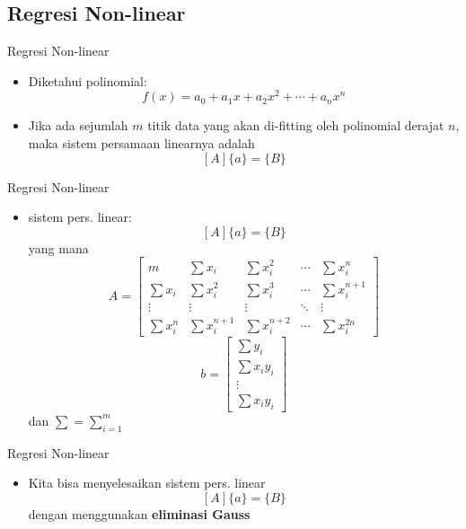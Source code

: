 \documentclass[pdflatex,compress,mathserif]{beamer}
\begin{document}
\subsection{Regresi Non-linear}

\begin{frame}{Regresi Non-linear}
	\begin{itemize}
		\item Diketahui polinomial:
		$$ f(x) = a_0 + a_1 x + a_2 x^2 + \cdots + a_n x^n $$
		\item Jika ada sejumlah $m$ titik data yang akan di-fitting oleh polinomial derajat $n$, maka sistem persamaan linearnya adalah
		$$ [A]\{a\} = \{B\} $$
	\end{itemize}
\end{frame}

\begin{frame}{Regresi Non-linear}
	\begin{itemize}
		\item sistem pers. linear: $$ [A]\{a\} = \{B\} $$
		yang mana
		$$ A = \begin{bmatrix}
			m & \sum x_i & \sum x_i^2 & \cdots & \sum x_i^n \\
			\sum x_i & \sum x_i^2 & \sum x_i^3 & \cdots & \sum x_i^{n+1} \\
			\vdots & \vdots & \vdots & \ddots & \vdots \\
			\sum x_i^n & \sum x_i^{n+1} & \sum x_i^{n+2} & \cdots & \sum x_i^{2n}
		\end{bmatrix} $$
		$$ b = \begin{bmatrix}
			\sum y_i \\ \sum x_i y_i \\ \vdots \\ \sum x_i y_i
		\end{bmatrix} $$ dan $ \sum = \sum_{i = 1}^{m}$
	\end{itemize}
\end{frame}

\begin{frame}{Regresi Non-linear}
	\begin{itemize}
		\item Kita bisa menyelesaikan sistem pers. linear $$ [A]\{a\} = \{B\} $$ dengan menggunakan \textbf{eliminasi Gauss}
	\end{itemize}
\end{frame}
\end{document}
